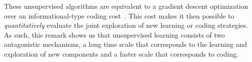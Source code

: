 \documentclass[draft]{article} %
\begin{document}
These unsupervised algorithms are equivalent to a gradient descent optimization over an informational-type coding cost~\citep{Kingma13}. This cost makes it then possible to \emph{quantitatively} evaluate the joint exploration of new learning or coding strategies.
As such, this remark shows us that unsupervised learning consists of two antagonistic mechanisms, a long time scale that corresponds to the learning and exploration of new components and a faster scale that corresponds to coding.
\end{document}
